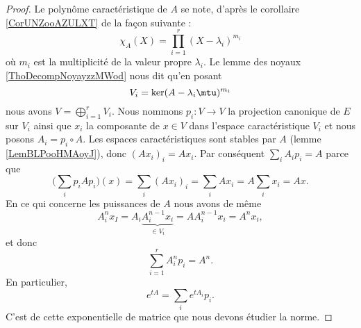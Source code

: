 \begin{proof}
    Le polynôme caractéristique de \( A\) se note, d'après le corollaire \ref{CorUNZooAZULXT} de la façon suivante :
    \begin{equation}
        \chi_A(X)=\prod_{i=1}^r(X-\lambda_i)^{m_i}
    \end{equation}
    où \( m_i\) est la multiplicité de la valeur propre \( \lambda_i\). Le lemme des noyaux \ref{ThoDecompNoyayzzMWod} nous dit qu'en posant
    \begin{equation}
        V_i=\ker(A-\lambda_i\mtu)^{m_i}
    \end{equation}
    nous avons \( V=\bigoplus_{i=1}^rV_i\). Nous nommons \( p_i\colon V\to V\) la projection canonique de \( E\) sur \( V_i\) ainsi que \( x_i\) la composante de \( x\in V\) dans l'espace caractéristique \( V_i\) et nous posons \( A_i=p_i\circ A\). Les espaces caractéristiques sont stables par \( A\) (lemme \ref{LemBLPooHMAoyJ}), donc \( (Ax_i)_i=Ax_i\). Par conséquent \( \sum_i A_ip_i=A\) parce que
    \begin{equation}
        \big( \sum_ip_iAp_i \big)(x)=\sum_i(Ax_i)_i=\sum_iAx_i=A\sum_ix_i=Ax.
    \end{equation}
    En ce qui concerne les puissances de \( A\) nous avons de même
    \begin{equation}
        A_i^nx_I=A_i\underbrace{A_i^{n-1}x_i}_{\in V_i}=AA_i^{n-1}x_i=A^nx_i,
    \end{equation}
    et donc
    \begin{equation}
        \sum_{i=1}^rA_i^np_i=A^n.
    \end{equation}
    En particulier,
    \begin{equation}    \label{EqPVIooGxwFBH}
        e^{tA}=\sum_i e^{tA_i}p_i.
    \end{equation}
    C'est de cette exponentielle de matrice que nous devons étudier la norme.


\end{proof}
